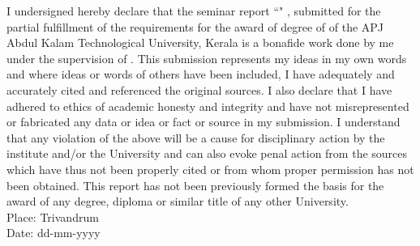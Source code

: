
I undersigned hereby declare that the seminar report ``\projectname{}" 
, submitted for the partial fulfillment of the requirements for the award of degree of \degree{} of the APJ Abdul Kalam Technological University, Kerala is a bonafide work done by me under the supervision of \guide{}. This submission represents my ideas in my own words and where ideas or words of others have been included, I have adequately and accurately cited and referenced the original sources. I also declare that I have adhered to ethics of academic honesty and integrity and have not misrepresented or fabricated any data or idea or fact or source in my submission. I understand that any violation of the above will be a cause for disciplinary action by the institute and/or the University and can also evoke penal action from the sources which have thus not been properly cited or from whom proper permission has not been obtained. This report has not been previously formed the basis for the award of any degree, diploma or similar title of any other University. 
\vspace{20mm}
\\Place: Trivandrum								
\\Date: dd-mm-yyyy     \hfill     \stud{} 
